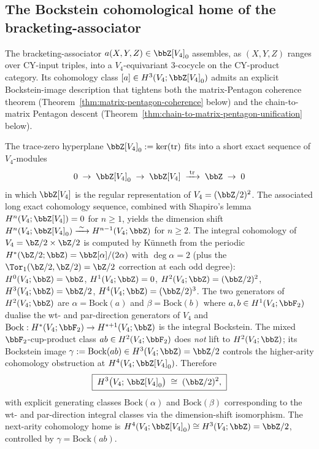 \subsection{The Bockstein cohomological home of the bracketing-associator}
\label{subsec:bockstein-home-bracketing-associator}

The bracketing-associator $a(X, Y, Z) \in \bbZ[V_4]_0$ assembles, as
$(X, Y, Z)$ ranges over CY-input triples, into a $V_4$-equivariant
$3$-cocycle on the CY-product category. Its cohomology class
$[a] \in H^3(V_4; \bbZ[V_4]_0)$ admits an explicit Bockstein-image
description that tightens both the matrix-Pentagon coherence theorem
\textup{(}Theorem~\ref{thm:matrix-pentagon-coherence} below\textup{)} and
the chain-to-matrix Pentagon descent
\textup{(}Theorem~\ref{thm:chain-to-matrix-pentagon-unification} below\textup{).}

\begin{lemma}
\label{lem:V4-cohomology-bracketing-home}
The trace-zero hyperplane $\bbZ[V_4]_0 := \ker(\mathrm{tr})$ fits into a short
exact sequence of $V_4$-modules
\[
 0 \;\to\; \bbZ[V_4]_0 \;\to\; \bbZ[V_4] \;\xrightarrow{\;\mathrm{tr}\;}\; \bbZ \;\to\; 0
\]
in which $\bbZ[V_4]$ is the regular representation of $V_4 = (\bbZ/2)^2$. The
associated long exact cohomology sequence, combined with Shapiro's lemma
$H^n(V_4; \bbZ[V_4]) = 0$ for $n \geq 1$, yields the dimension shift
$
 H^n(V_4; \bbZ[V_4]_0) \xrightarrow{\;\sim\;} H^{n-1}(V_4; \bbZ)
$
for $n \geq 2$. The integral cohomology of $V_4 = \bZ/2 \times \bZ/2$ is
computed by K\"unneth from the periodic
$H^*(\bZ/2; \bbZ) = \bbZ[\alpha]/(2\alpha)$ with $\deg \alpha = 2$
\textup{(}plus the $\Tor_1(\bZ/2, \bZ/2) = \bZ/2$ correction at each odd
degree\textup{):}
$H^0(V_4; \bbZ) = \bbZ$, $H^1(V_4; \bbZ) = 0$,
$H^2(V_4; \bbZ) = (\bbZ/2)^2$, $H^3(V_4; \bbZ) = \bbZ/2$,
$H^4(V_4; \bbZ) = (\bbZ/2)^3$.
The two generators of $H^2(V_4; \bbZ)$ are $\alpha = \mathrm{Bock}(a)$ and
$\beta = \mathrm{Bock}(b)$ where $a, b \in H^1(V_4; \bbF_2)$ dualise the
wt- and par-direction generators of $V_4$ and $\mathrm{Bock} : H^*(V_4; \bbF_2)
\to H^{*+1}(V_4; \bbZ)$ is the integral Bockstein. The mixed
$\bbF_2$-cup-product class $ab \in H^2(V_4; \bbF_2)$ does \emph{not} lift
to $H^2(V_4; \bbZ)$; its Bockstein image
$\gamma := \mathrm{Bock}(ab) \in H^3(V_4; \bbZ) = \bbZ/2$ controls the
higher-arity cohomology obstruction at $H^4(V_4; \bbZ[V_4]_0)$. Therefore
\[
 \boxed{\;H^3\bigl(V_4;\, \bbZ[V_4]_0\bigr) \;\cong\; (\bbZ/2)^2,\;}
\]
with explicit generating classes $\mathrm{Bock}(\alpha)$ and
$\mathrm{Bock}(\beta)$ corresponding to the wt- and par-direction integral
classes via the dimension-shift isomorphism. The next-arity cohomology home
is $H^4(V_4; \bbZ[V_4]_0) \cong H^3(V_4; \bbZ) = \bbZ/2$, controlled by
$\gamma = \mathrm{Bock}(ab)$.
\end{lemma}

